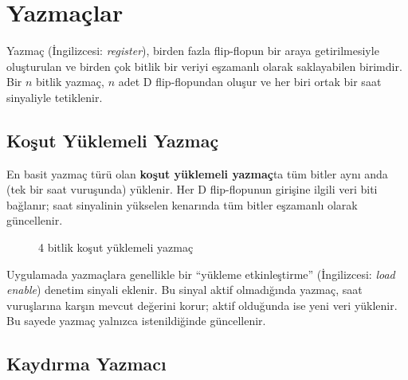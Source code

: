\section{Yazmaçlar}
\label{sec:ekB-yazmaclar}

Yazmaç (İngilizcesi: \textit{register}), birden fazla flip-flopun bir araya getirilmesiyle oluşturulan ve birden çok bitlik bir veriyi eşzamanlı olarak saklayabilen birimdir. Bir $n$ bitlik yazmaç, $n$ adet D flip-flopundan oluşur ve her biri ortak bir saat sinyaliyle tetiklenir.

\subsection{Koşut Yüklemeli Yazmaç}

En basit yazmaç türü olan \textbf{koşut yüklemeli yazmaç}ta tüm bitler aynı anda (tek bir saat vuruşunda) yüklenir. Her D flip-flopunun girişine ilgili veri biti bağlanır; saat sinyalinin yükselen kenarında tüm bitler eşzamanlı olarak güncellenir.

\begin{figure}[H]
\centering
{}
\caption{4 bitlik koşut yüklemeli yazmaç}
\label{fig:kosut-yazmac}
\end{figure}

Uygulamada yazmaçlara genellikle bir ``yükleme etkinleştirme'' (İngilizcesi: \textit{load enable}) denetim sinyali eklenir. Bu sinyal aktif olmadığında yazmaç, saat vuruşlarına karşın mevcut değerini korur; aktif olduğunda ise yeni veri yüklenir. Bu sayede yazmaç yalnızca istenildiğinde güncellenir.

\subsection{Kaydırma Yazmacı}

